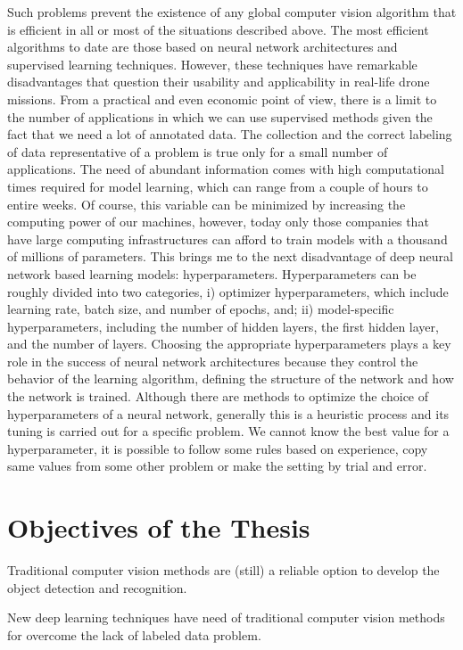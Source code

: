 Such problems prevent the existence of any global computer vision algorithm that is efficient in all or most of the situations described above. The most efficient algorithms to date are those based on neural network architectures and supervised learning techniques. However, these techniques have remarkable disadvantages that question their usability and applicability in real-life drone missions. 
From a practical and even economic point of view, there is a limit to the number of applications in which we can use supervised methods given the fact that we need a lot of annotated data. The collection and the correct labeling of data representative of a problem is true only for a small number of applications. 
The need of abundant information comes with high computational times required for model learning, which can range from a couple of hours to entire weeks. Of course, this variable can be minimized by increasing the computing power of our machines, however, today only those companies that have large computing infrastructures can afford to train models with a thousand of millions of parameters. 
This brings me to the next disadvantage of deep neural network based learning models: hyperparameters. Hyperparameters can be roughly divided into two categories, i) optimizer hyperparameters, which include learning rate, batch size, and number of epochs, and; ii) model-specific hyperparameters, including the number of hidden layers, the first hidden layer, and the number of layers. Choosing the appropriate hyperparameters plays a key role in the success of neural network architectures because they control the behavior of the learning algorithm, defining the structure of the network and how the network is trained. Although there are methods to optimize the choice of hyperparameters of a neural network, generally this is a heuristic process and its tuning is carried out for a specific problem. We cannot know the best value for a hyperparameter, it is possible to follow some rules based on experience, copy same values from some other problem or make the setting by trial and error.

 

\section{Objectives of the Thesis}
Traditional computer vision methods are (still) a reliable option to develop the object detection and recognition.

New deep learning techniques have need of traditional computer vision methods for overcome the lack of labeled data problem.

